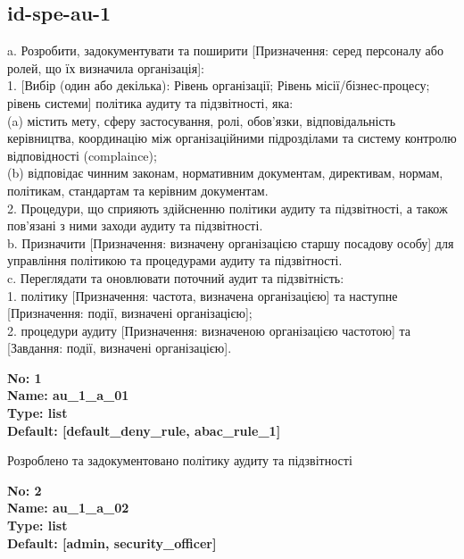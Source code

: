 \documentclass{article}
\begin{document}
\subsection{id-spe-au-1}
a. Розробити, задокументувати та поширити [Призначення: серед персоналу або ролей, що їх визначила організація]:\\ 
1. [Вибір (один або декілька): Рівень організації; Рівень місії/бізнес-процесу; рівень системи] політика аудиту та підзвітності, яка:\\ 
(a) містить мету, сферу застосування, ролі, обов'язки, відповідальність керівництва, координацію між організаційними підрозділами та систему контролю відповідності (complaince);\\ 
(b) відповідає чинним законам, нормативним документам, директивам, нормам, політикам, стандартам та керівним документам.\\ 
2. Процедури, що сприяють здійсненню політики аудиту та підзвітності, а також пов'язані з ними заходи аудиту та підзвітності.\\ 
b. Призначити [Призначення: визначену організацією старшу посадову особу] для управління політикою та процедурами аудиту та підзвітності.\\ 
c. Переглядати та оновлювати поточний аудит та підзвітність:\\ 
1. політику [Призначення: частота, визначена організацією] та наступне [Призначення: події, визначені організацією];\\ 
2. процедури аудиту [Призначення: визначеною організацією частотою] та [Завдання: події, визначені організацією].

\vspace{10pt}
{\footnotesize\bfseries
No: 1\\
Name: au\_\allowbreak{}1\_\allowbreak{}a\_\allowbreak{}01\\
Type: list\\
Default: [\textquotedbl{}default\_\allowbreak{}deny\_\allowbreak{}rule\textquotedbl{}, \textquotedbl{}abac\_\allowbreak{}rule\_\allowbreak{}1\textquotedbl{}]
}

{\footnotesize Розроблено та задокументовано політику аудиту та підзвітності}


{\footnotesize\bfseries
No: 2\\
Name: au\_\allowbreak{}1\_\allowbreak{}a\_\allowbreak{}02\\
Type: list\\
Default: [\textquotedbl{}admin\textquotedbl{}, \textquotedbl{}security\_\allowbreak{}officer\textquotedbl{}]
}
\end{document}

